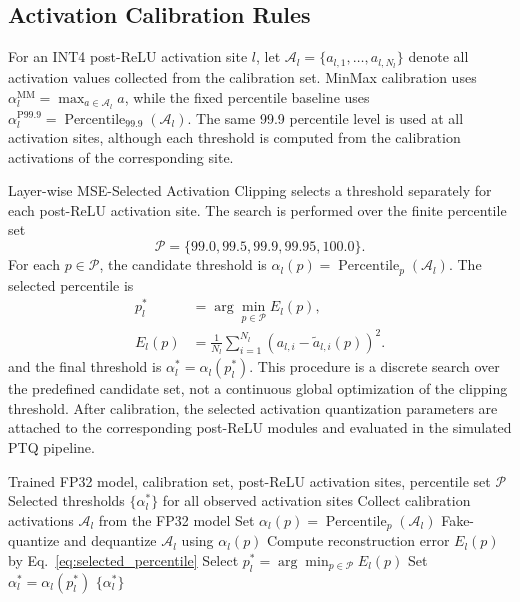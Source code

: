\subsection{Activation Calibration Rules}
\label{subsec:activation_calibration_rules}

For an INT4 post-ReLU activation site $l$, let $\mathcal{A}_l=\{a_{l,1},\ldots,a_{l,N_l}\}$ denote all activation values collected from the calibration set. MinMax calibration uses $\alpha_l^{\mathrm{MM}}=\max_{a\in\mathcal{A}_l}a$, while the fixed percentile baseline uses $\alpha_l^{\mathrm{P99.9}}=\operatorname{Percentile}_{99.9}(\mathcal{A}_l)$. The same 99.9 percentile level is used at all activation sites, although each threshold is computed from the calibration activations of the corresponding site.

Layer-wise MSE-Selected Activation Clipping selects a threshold separately for each post-ReLU activation site. The search is performed over the finite percentile set
\begin{equation}
\mathcal{P}=\{99.0,99.5,99.9,99.95,100.0\}.
\label{eq:candidate_set}
\end{equation}
For each $p\in\mathcal{P}$, the candidate threshold is $\alpha_l(p)=\operatorname{Percentile}_{p}(\mathcal{A}_l)$. The selected percentile is
\begin{equation}
\begin{aligned}
p_l^{\ast} &= \arg\min_{p\in\mathcal{P}} E_l(p), \\
E_l(p) &= \frac{1}{N_l}\sum_{i=1}^{N_l}\left(a_{l,i}-\tilde{a}_{l,i}(p)\right)^2.
\end{aligned}
\label{eq:selected_percentile}
\end{equation}
and the final threshold is $\alpha_l^{\ast}=\alpha_l(p_l^{\ast})$. This procedure is a discrete search over the predefined candidate set, not a continuous global optimization of the clipping threshold. After calibration, the selected activation quantization parameters are attached to the corresponding post-ReLU modules and evaluated in the simulated PTQ pipeline.

\begin{algorithm}[t]
\caption{Layer-wise MSE-Selected Activation Clipping}
\label{alg:mse_selected_clipping}
\begin{algorithmic}[1]
\REQUIRE Trained FP32 model, calibration set, post-ReLU activation sites, percentile set $\mathcal{P}$
\ENSURE Selected thresholds $\{\alpha_l^{\ast}\}$ for all observed activation sites
    \STATE Collect calibration activations $\mathcal{A}_l$ from the FP32 model
        \STATE Set $\alpha_l(p)=\operatorname{Percentile}_{p}(\mathcal{A}_l)$
        \STATE Fake-quantize and dequantize $\mathcal{A}_l$ using $\alpha_l(p)$
        \STATE Compute reconstruction error $E_l(p)$ by Eq.~\eqref{eq:selected_percentile}
    \ENDFOR
    \STATE Select $p_l^{\ast}=\arg\min_{p\in\mathcal{P}}E_l(p)$
    \STATE Set $\alpha_l^{\ast}=\alpha_l(p_l^{\ast})$
\ENDFOR
\RETURN $\{\alpha_l^{\ast}\}$
\end{algorithmic}
\end{algorithm}

